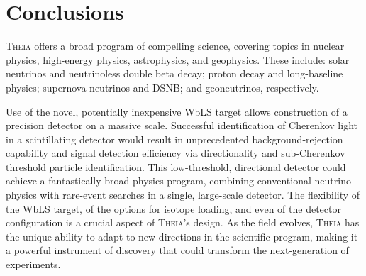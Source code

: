 \documentclass[11pt,prd,letterpaper,amsmath,amssymb,final,nofootinbib
,unsortedaddress,superscriptaddress
]{revtex4-1}
\begin{document}
%
%
%
%
%
%


\section{Conclusions}

\textsc{Theia} offers a broad program of compelling science, covering topics in nuclear physics, high-energy physics, astrophysics, and geophysics.  These include: solar neutrinos and neutrinoless double beta decay; proton decay and long-baseline physics; supernova neutrinos and DSNB;  and geoneutrinos, respectively.

Use of the novel, potentially inexpensive WbLS target  allows construction of a precision detector on a massive scale.  
Successful identification of Cherenkov light in a scintillating detector would result in unprecedented background-rejection capability and signal detection efficiency via directionality and sub-Cherenkov threshold particle identification.  This low-threshold, directional detector could achieve a fantastically broad physics program, combining conventional neutrino physics with rare-event searches in a single, large-scale detector.
The flexibility of the WbLS target, of the options for isotope loading, and even of the detector configuration is a crucial aspect of \textsc{Theia}'s design.  As the field evolves, \textsc{Theia} has the unique ability to adapt to new directions in the scientific program, making it a powerful instrument of discovery that could transform the next-generation of experiments.  
\end{document}
